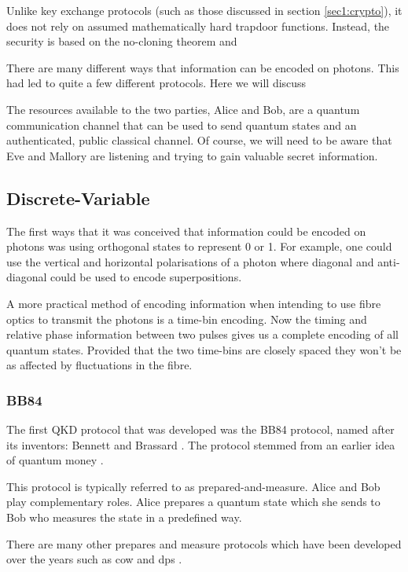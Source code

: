 Unlike key exchange protocols (such as those discussed in section \ref{sec1:crypto}), it does not rely on assumed mathematically hard trapdoor functions. Instead, the security is based on the no-cloning theorem and 

There are many different ways that information can be encoded on photons. This had led to quite a few different protocols. Here we will discuss 

The resources available to the two parties, Alice and Bob, are a quantum communication channel that can be used to send quantum states and an authenticated, public classical channel. Of course, we will need to be aware that Eve and Mallory are listening and trying to gain valuable secret information.

\subsection{Discrete-Variable}

The first ways that it was conceived that information could be encoded on photons was using orthogonal states to represent 0 or 1. For example, one could use the vertical and horizontal polarisations of a photon where diagonal and anti-diagonal could be used to encode superpositions. 

A more practical method of encoding information when intending to use fibre optics to transmit the photons is a time-bin encoding. Now the timing and relative phase information between two pulses gives us a complete encoding of all quantum states. Provided that the two time-bins are closely spaced they won't be as affected by fluctuations in the fibre.

\subsubsection*{BB84}

The first \ac{QKD} protocol that was developed was the BB84 protocol, named after its inventors: Bennett and Brassard \cite{BB84}. The protocol stemmed from an earlier idea of quantum money \cite{quantum_money}.

This protocol is typically referred to as {\color{bristol-red}prepared-and-measure}. Alice and Bob play complementary roles. Alice {\color{bristol-red}prepares} a quantum state which she sends to Bob who {\color{bristol-red}measures} the state in a predefined way. 

There are many other prepares and measure protocols which have been developed over the years such as \ac{cow} \cite{COW-QKD} and \ac{dps} \cite{DPS-QKD}.

